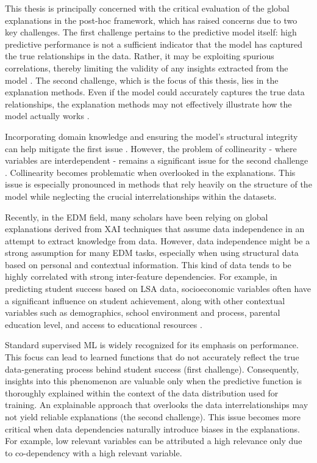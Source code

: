 This thesis is principally concerned with the critical evaluation of the global explanations in the post-hoc framework, which has raised concerns due to two key challenges. The first challenge pertains to the predictive model itself: high predictive performance is not a sufficient indicator that the model has captured the true relationships in the data. Rather, it may be exploiting spurious correlations, thereby limiting the validity of any insights extracted from the model \cite{Mittelstadt2019ExplainingAI}. The second challenge, which is the focus of this thesis, lies in the explanation methods. Even if the model could accurately captures the true data relationships, the explanation methods may not effectively illustrate how the model actually works \cite{Rudin2019StopInstead, Mittelstadt2019ExplainingAI}.

Incorporating domain knowledge and ensuring the model's structural integrity can help mitigate the first issue \cite{Frye2021ShapleyManifold, Zhao2021CausalModels}. However, the problem of collinearity - where variables are interdependent - remains a significant issue for the second challenge \cite{Hooker2019UnrestrictedImportance}. Collinearity becomes problematic when overlooked in the explanations. This issue is especially pronounced in methods that rely heavily on the structure of the model while neglecting the crucial interrelationships within the datasets.

Recently, in the \gls{EDM} field, many scholars have been relying on global explanations derived from \gls{XAI}  techniques that assume data independence in an attempt to extract knowledge from data. However, data independence might be a strong assumption for many \gls{EDM} tasks, especially when using structural data based on personal and contextual information. This kind of data tends to be highly correlated with strong inter-feature dependencies. For example, in predicting student success based on \gls{LSA} data, socioeconomic variables often have a significant influence on student achievement, along with other contextual variables such as demographics, school environment and process, parental education level, and access to educational resources \cite{coleman1968equality, Andrade2008OBrasileira}. 

Standard supervised \gls{ML} is widely recognized for its emphasis on performance. This focus can lead to learned functions that do not accurately reflect the true data-generating process behind student success (first challenge). Consequently, insights into this phenomenon are valuable only when the predictive function is thoroughly explained within the context of the data distribution used for training. An explainable approach that overlooks the data interrelationships may not yield reliable explanations (the second challenge).  This issue becomes more critical when data dependencies naturally introduce biases in the explanations. For example, low relevant variables can be attributed a high relevance only due to co-dependency with a high relevant variable. 

